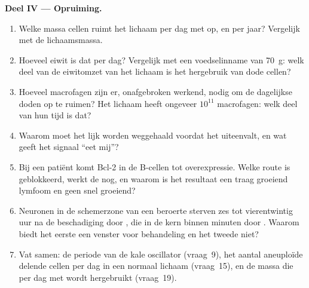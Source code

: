 \begin{problem}
\medskip
\noindent\textbf{Deel IV --- Opruiming.}
\begin{enumerate}[resume]
  \item Welke massa cellen ruimt het lichaam per dag met  op, en
        per jaar? Vergelijk met de lichaamsmassa.
  \item Hoeveel eiwit is dat per dag? Vergelijk met een voedselinname
        van \qty{70}{g}: welk deel van de eiwitomzet van het lichaam is
        het hergebruik van dode cellen?
  \item Hoeveel macrofagen zijn er, onafgebroken werkend, nodig om de
        dagelijkse doden op te ruimen? Het lichaam heeft ongeveer
        $10^{11}$ macrofagen: welk deel van hun tijd is dat?
  \item Waarom moet het lijk worden weggehaald voordat het uiteenvalt,
        en wat geeft het signaal ``eet mij''?
  \item Bij een patiënt komt Bcl-2 in de B-cellen tot overexpressie.
        Welke route is geblokkeerd, werkt de  nog, en
        waarom is het resultaat een traag groeiend lymfoom en geen snel
        groeiend?
  \item Neuronen in de schemerzone van een beroerte sterven zes tot
        vierentwintig uur na de beschadiging door , die in de
        kern binnen minuten door . Waarom biedt het eerste een
        venster voor behandeling en het tweede niet?
  \item Vat samen: de periode van de kale oscillator (vraag~9), het
        aantal aneuploïde delende cellen per dag in een normaal lichaam
        (vraag~15), en de massa die per dag met  wordt
        hergebruikt (vraag~19).
\end{enumerate}
\end{problem}

